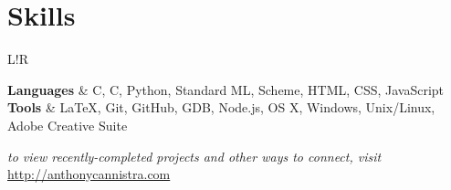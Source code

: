 \documentclass[10pt, letter]{article}
\newcommand\VRule{\color{lightgray}\vrule width 0.5pt}
\newcommand{\CC}{C\nolinebreak\hspace{-.05em}\raisebox{.4ex}{\tiny\bf +}\nolinebreak\hspace{-.10em}\raisebox{.4ex}{\tiny\bf +}}
\def\CC{{C\nolinebreak[4]\hspace{-.05em}\raisebox{.4ex}{\tiny\bf ++}}}
\begin{document}
   
\vspace{6pt}


\vspace{-15pt}
\section*{Skills}
\begin{tabular}{L!{\VRule}R}

\textbf{Languages} & C, \CC, Python, Standard ML, Scheme, HTML, CSS, JavaScript \vspace{6pt}  \\
\textbf{Tools} \vspace{6pt} & \LaTeX, Git, GitHub, GDB, Node.js, OS X, Windows, Unix/Linux, Adobe Creative Suite \\
\end{tabular}
\null
\vfill
\emph{to view recently-completed projects and other ways to connect, visit} \url{http://anthonycannistra.com}
\end{document}
